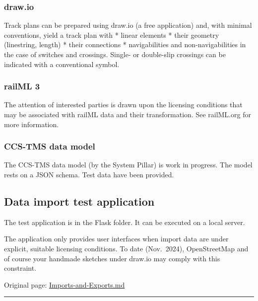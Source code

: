 \documentclass[
  11pt,
]{article}
\begin{document}
\hypertarget{draw.io}{%
\subsubsection{draw.io}\label{draw.io}}

Track plans can be prepared using draw.io (a free application) and, with
minimal conventions, yield a track plan with * linear elements * their
geometry (linestring, length) * their connections * navigabilities and
non-navigabilities in the case of switches and crossings. Single- or
double-slip crossings can be indicated with a conventional symbol.

\hypertarget{railml-3}{%
\subsubsection{railML 3}\label{railml-3}}

The attention of interested parties is drawn upon the licensing
conditions that may be associated with railML data and their
transformation. See railML.org for more information.

\hypertarget{ccs-tms-data-model}{%
\subsubsection{CCS-TMS data model}\label{ccs-tms-data-model}}

The CCS-TMS data model (by the System Pillar) is work in progress. The
model rests on a JSON schema. Test data have been provided.

\hypertarget{data-import-test-application}{%
\subsection{Data import test
application}\label{data-import-test-application}}

The test application is in the Flask folder. It can be executed on a
local server.

The application only provides user interfaces when import data are under
explicit, suitable licensing conditions. To date (Nov.~2024),
OpenStreetMap and of course your handmade sketches under draw.io may
comply with this constraint.

Original page:
\href{https://github.com/UICrail/CDM-RSM/wiki/Imports-and-Exports}{Imports-and-Exports.md}

\begin{center}\rule{0.5\linewidth}{0.5pt}\end{center}
\end{document}
